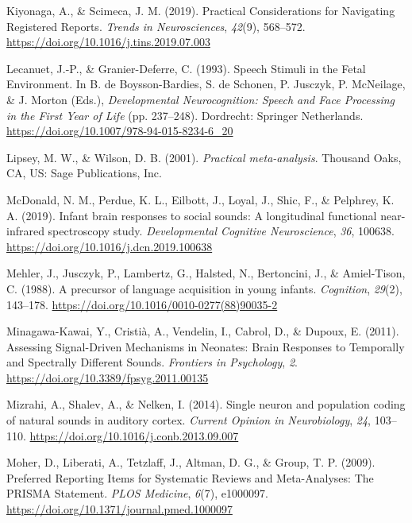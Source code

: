 \documentclass[man]{apa6}
\begin{document}
\leavevmode\hypertarget{ref-kiyonaga_practical_2019}{}%
Kiyonaga, A., \& Scimeca, J. M. (2019). Practical Considerations for Navigating Registered Reports. \emph{Trends in Neurosciences}, \emph{42}(9), 568--572. \url{https://doi.org/10.1016/j.tins.2019.07.003}

\leavevmode\hypertarget{ref-lecanuet_speech_1993}{}%
Lecanuet, J.-P., \& Granier-Deferre, C. (1993). Speech Stimuli in the Fetal Environment. In B. de Boysson-Bardies, S. de Schonen, P. Jusczyk, P. McNeilage, \& J. Morton (Eds.), \emph{Developmental Neurocognition: Speech and Face Processing in the First Year of Life} (pp. 237--248). Dordrecht: Springer Netherlands. \url{https://doi.org/10.1007/978-94-015-8234-6_20}

\leavevmode\hypertarget{ref-lipsey_practical_2001}{}%
Lipsey, M. W., \& Wilson, D. B. (2001). \emph{Practical meta-analysis}. Thousand Oaks, CA, US: Sage Publications, Inc.

\leavevmode\hypertarget{ref-mcdonald_infant_2019}{}%
McDonald, N. M., Perdue, K. L., Eilbott, J., Loyal, J., Shic, F., \& Pelphrey, K. A. (2019). Infant brain responses to social sounds: A longitudinal functional near-infrared spectroscopy study. \emph{Developmental Cognitive Neuroscience}, \emph{36}, 100638. \url{https://doi.org/10.1016/j.dcn.2019.100638}

\leavevmode\hypertarget{ref-mehler_precursor_1988}{}%
Mehler, J., Jusczyk, P., Lambertz, G., Halsted, N., Bertoncini, J., \& Amiel-Tison, C. (1988). A precursor of language acquisition in young infants. \emph{Cognition}, \emph{29}(2), 143--178. \url{https://doi.org/10.1016/0010-0277(88)90035-2}

\leavevmode\hypertarget{ref-minagawa-kawai_assessing_2011}{}%
Minagawa-Kawai, Y., Cristià, A., Vendelin, I., Cabrol, D., \& Dupoux, E. (2011). Assessing Signal-Driven Mechanisms in Neonates: Brain Responses to Temporally and Spectrally Different Sounds. \emph{Frontiers in Psychology}, \emph{2}. \url{https://doi.org/10.3389/fpsyg.2011.00135}

\leavevmode\hypertarget{ref-mizrahi_single_2014}{}%
Mizrahi, A., Shalev, A., \& Nelken, I. (2014). Single neuron and population coding of natural sounds in auditory cortex. \emph{Current Opinion in Neurobiology}, \emph{24}, 103--110. \url{https://doi.org/10.1016/j.conb.2013.09.007}

\leavevmode\hypertarget{ref-moher_preferred_2009}{}%
Moher, D., Liberati, A., Tetzlaff, J., Altman, D. G., \& Group, T. P. (2009). Preferred Reporting Items for Systematic Reviews and Meta-Analyses: The PRISMA Statement. \emph{PLOS Medicine}, \emph{6}(7), e1000097. \url{https://doi.org/10.1371/journal.pmed.1000097}
\end{document}
